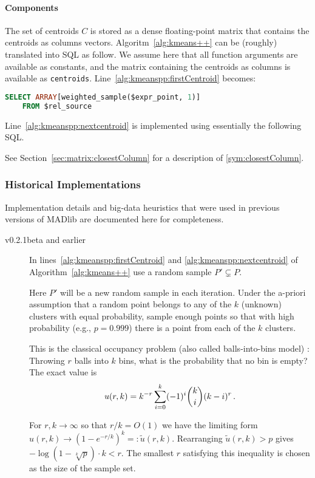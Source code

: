 \paragraph{Components} The set of centroids $C$ is stored as a dense floating-point matrix that contains the centroids as columns vectors. Algoritm~\ref{alg:kmeans++} can be (roughly) translated into SQL as follow. We assume here that all function arguments are available as constants, and the matrix containing the centroids as columns is available as \texttt{centroids}. Line~\ref{alg:kmeanspp:firstCentroid} becomes:
\begin{lstlisting}[language=SQL,gobble=4]
    SELECT ARRAY[weighted_sample($expr_point, 1)]
    FROM $rel_source
\end{lstlisting}
Line~\ref{alg:kmeanspp:nextcentroid} is implemented using essentially the following SQL.
See Section~\ref{sec:matrix:closestColumn} for a description of \ref{sym:closestColumn}.

\subsubsection{Historical Implementations}

Implementation details and big-data heuristics that were used in previous versions of MADlib are documented here for completeness.

\begin{description}
	\item[v0.2.1beta and earlier] In lines~\ref{alg:kmeanspp:firstCentroid} and \ref{alg:kmeanspp:nextcentroid} of Algorithm~\ref{alg:kmeans++} use a random sample $P' \subsetneq P$.

		Here $P'$ will be a new random sample in each iteration. Under the a-priori assumption that a random point belongs to any of the $k$ (unknown) clusters with equal probability, sample enough points so that with high probability (e.g., $p = 0.999$) there is a point from each of the $k$ clusters.

		This is the classical occupancy problem (also called balls-into-bins model) \cite{F68a}: Throwing $r$ balls into $k$ bins, what is the probability that no bin is empty? The exact value is
		\begin{align*}
			u(r, k) = k^{-r} \sum_{i=0}^k (-1)^i \binom ki (k - i)^r
			\SiM.
		\end{align*}

		For $r,k \to \infty$ so that $r/k = O(1)$ we have the limiting form $u(r,k) \to (1 - e^{-r/k})^k =: \widetilde u(r, k)$. Rearranging $\widetilde u(r, k) > p$ gives $-\log(1 - \sqrt[k]p) \cdot k < r$. The smallest $r$ satisfying this inequality is chosen as the size of the sample set.
\end{description}

